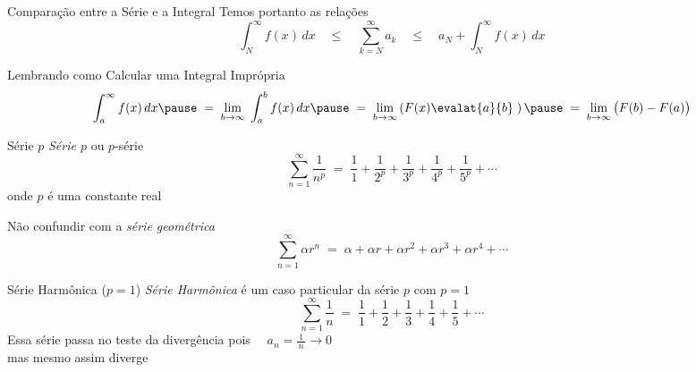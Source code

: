 \documentclass[fleqn,utf8,aspectratio=169,12pt]{beamer}
\begin{document}
\begin{frame}{Comparação entre a Série e a Integral}
  Temos portanto as relações
  \[
    \int_{N}^{\infty} f(x)\,dx
    \quad\leq\quad
    \sum_{k=N}^{\infty} a_k
    \quad\leq\quad
    a_N + \int_{N}^{\infty} f(x)\,dx
  \]
\end{frame}

\begin{frame}{Lembrando como Calcular uma Integral Imprópria}
  \[
    \int_{a}^{\infty} f(x)\,dx
    \pause \;=\;
    \lim_{b\to\infty} \; \int_{a}^{b} f(x)\,dx
    \pause \;=\;
    \lim_{b\to\infty} \left( F(x) \evalat{a}{b} \; \right)
    \pause \;=\;
    \lim_{b\to\infty} \big( F(b) - F(a) \big)
  \]
\end{frame}

\begin{frame}{Série $p$}
  \emph{Série $p$} ou $p$-série
  \[ \sum_{n=1}^{\infty} \frac{1}{n^p} \;=\;
     \frac{1}{1} +
     \frac{1}{2^p} +
     \frac{1}{3^p} +
     \frac{1}{4^p} +
     \frac{1}{5^p} + \cdots
  \]
  onde $p$ é uma constante real

  \pause
  \vspace{\baselineskip}
  Não confundir com a \emph{série geométrica}
  \[
    \sum_{n=1}^{\infty} \alpha r^n
    \;=\; \alpha + \alpha r + \alpha r^2 + \alpha r^3 + \alpha r^4 + \cdots
  \]

\end{frame}

\begin{frame}{Série Harmônica ($p=1$)}
  \emph{Série Harmônica} é um caso particular da série $p$ com $p=1$
  \[ \sum_{n=1}^{\infty} \frac{1}{n} \;=\;
     \frac{1}{1} +
     \frac{1}{2} +
     \frac{1}{3} +
     \frac{1}{4} +
     \frac{1}{5} + \cdots
  \]
  \pause
  Essa série passa no teste da divergência pois \(\quad a_n = \frac{1}{\,n\,}\to 0\) \\[3mm]
  mas mesmo assim diverge
\end{frame}
\end{document}
